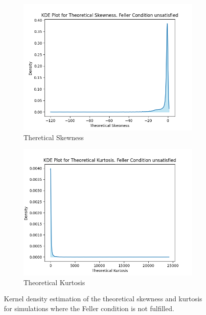 \begin{figure}
    \centering
    \begin{subfigure}[b]{0.49\textwidth}
        \centering
        \includegraphics[width=\textwidth]{img/kde_theoretical_skewness_feller_false.png}
        \caption{Theretical Skewness}
    \end{subfigure}
    \hfill
    \begin{subfigure}[b]{0.49\textwidth}
        \centering
        \includegraphics[width=\textwidth]{img/kde_theoretical_kurtosis_feller_false.png}
        \caption{Theoretical Kurtosis}
    \end{subfigure}
    \caption{Kernel density estimation of the theoretical skewness and kurtosis for simulations where the Feller condition is not fulfilled.}
    \label{fig:kde_theoretical_skewness_kurtosis_feller_false}
\end{figure}

